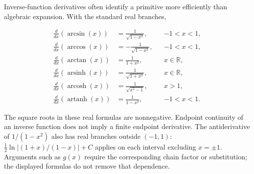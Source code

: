 \documentclass[11pt,oneside,openany]{book}
\begin{document}
\par\addvspace{8pt}\noindent\begin{minipage}{\linewidth}
Inverse-function derivatives often identify a primitive more efficiently than
algebraic expansion. With the standard real branches,

\[
\begin{aligned}
\frac{d}{dx}(\arcsin(x))&=\frac{1}{\sqrt{1-x^2}},&&-1<x<1,\\
\frac{d}{dx}(\arccos(x))&=-\frac{1}{\sqrt{1-x^2}},&&-1<x<1,\\
\frac{d}{dx}(\arctan(x))&=\frac{1}{1+x^2},&&x\in\mathbb R,\\
\frac{d}{dx}(\operatorname{arsinh}(x))&=\frac{1}{\sqrt{1+x^2}},&&x\in\mathbb R,\\
\frac{d}{dx}(\operatorname{arcosh}(x))&=\frac{1}{\sqrt{x^2-1}},&&x>1,\\
\frac{d}{dx}(\operatorname{artanh}(x))&=\frac{1}{1-x^2},&&-1<x<1.
\end{aligned}
\]

The square roots in these real formulas are nonnegative. Endpoint continuity
of an inverse function does not imply a finite endpoint derivative. The
antiderivative of \(1/(1-x^2)\) also has real branches outside \((-1,1)\):
\(\frac12\ln|(1+x)/(1-x)|+C\) applies on each interval excluding \(x=\pm1\).
Arguments such as \(g(x)\) require the corresponding chain factor or substitution;
the displayed formulas do not remove that dependence.

\end{minipage}\par
\end{document}
